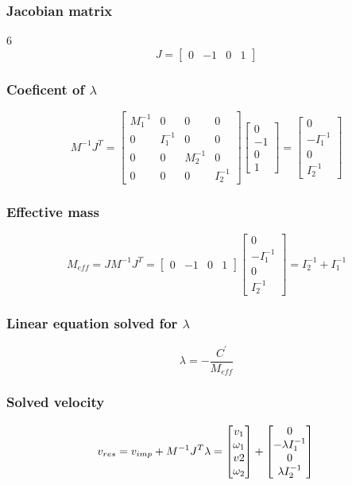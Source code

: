 \documentclass{article}
\begin{document}
	\subsubsection{Jacobian matrix}6
		$$
			J =
			\begin{bmatrix}
				0 & -1 & 0 & 1	
			\end{bmatrix}
		$$
	\subsubsection{Coeficent of $\lambda$}
		$$
			M^{-1}J^T=	
			\begin{bmatrix}
				M_1^{-1} 	& 0 		& 0 		& 0\\
				0 			& I_1^{-1} 	& 0 		& 0\\
				0 			& 0 		& M_2^{-1} 	& 0\\
				0 			& 0 		& 0 		& I_2^{-1}
			\end{bmatrix}
			\begin{bmatrix}
				0\\
				-1\\
				0\\
				1
			\end{bmatrix}
			=
			\begin{bmatrix}
				0\\
				-I_1^{-1}\\
				0\\
				I_2^{-1}
			\end{bmatrix}
		$$
	\subsubsection{Effective mass}
		$$
			M_{eff}=JM^{-1}J^T=
			\begin{bmatrix}
				0 & -1 & 0 & 1
			\end{bmatrix}
			\begin{bmatrix}
				0\\
				-I_1^{-1}\\
				0\\
				I_2^{-1}
			\end{bmatrix}
			=I_2^{-1}+I_1^{-1}
		$$
	\subsubsection{Linear equation solved for $\lambda$}
		$$
			\lambda=-\frac{C^{'}}{M_{eff}}
		$$
	\subsubsection{Solved velocity}
		$$
			v_{res}=v_{imp}+M^{-1}J^T\lambda=
			\begin{bmatrix}
			v_1\\
			\omega_1\\
			v2\\
			\omega_2
			\end{bmatrix}
			+
			\begin{bmatrix}
				0\\
				-\lambda I_1^{-1}\\
				0\\
				\lambda I_2^{-1}
			\end{bmatrix}\\
		$$
	\newpage
\end{document}
